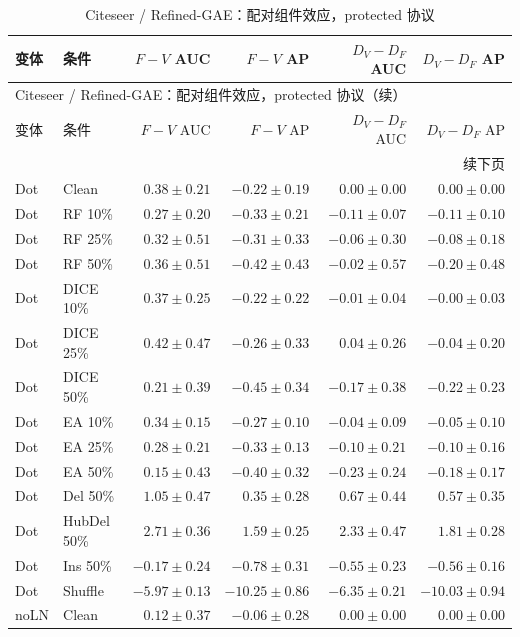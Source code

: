 {\footnotesize
\setlength{\tabcolsep}{3.2pt}
\renewcommand{\arraystretch}{1.10}
\begin{longtable}{llrrrr}
\caption{Citeseer / Refined-GAE：配对组件效应，protected 协议}\\
\toprule
变体 & 条件 & $F-V$ AUC & $F-V$ AP & $D_V-D_F$ AUC & $D_V-D_F$ AP \\
\midrule
\endfirsthead
\multicolumn{6}{l}{Citeseer / Refined-GAE：配对组件效应，protected 协议（续）}\\
\toprule
变体 & 条件 & $F-V$ AUC & $F-V$ AP & $D_V-D_F$ AUC & $D_V-D_F$ AP \\
\midrule
\endhead
\midrule\multicolumn{6}{r}{续下页}\\
\endfoot
\bottomrule
\endlastfoot
Dot & Clean & $0.38\pm0.21$ & $-0.22\pm0.19$ & $0.00\pm0.00$ & $0.00\pm0.00$ \\
Dot & RF 10\% & $0.27\pm0.20$ & $-0.33\pm0.21$ & $-0.11\pm0.07$ & $-0.11\pm0.10$ \\
Dot & RF 25\% & $0.32\pm0.51$ & $-0.31\pm0.33$ & $-0.06\pm0.30$ & $-0.08\pm0.18$ \\
Dot & RF 50\% & $0.36\pm0.51$ & $-0.42\pm0.43$ & $-0.02\pm0.57$ & $-0.20\pm0.48$ \\
Dot & DICE 10\% & $0.37\pm0.25$ & $-0.22\pm0.22$ & $-0.01\pm0.04$ & $-0.00\pm0.03$ \\
Dot & DICE 25\% & $0.42\pm0.47$ & $-0.26\pm0.33$ & $0.04\pm0.26$ & $-0.04\pm0.20$ \\
Dot & DICE 50\% & $0.21\pm0.39$ & $-0.45\pm0.34$ & $-0.17\pm0.38$ & $-0.22\pm0.23$ \\
Dot & EA 10\% & $0.34\pm0.15$ & $-0.27\pm0.10$ & $-0.04\pm0.09$ & $-0.05\pm0.10$ \\
Dot & EA 25\% & $0.28\pm0.21$ & $-0.33\pm0.13$ & $-0.10\pm0.21$ & $-0.10\pm0.16$ \\
Dot & EA 50\% & $0.15\pm0.43$ & $-0.40\pm0.32$ & $-0.23\pm0.24$ & $-0.18\pm0.17$ \\
Dot & Del 50\% & $1.05\pm0.47$ & $0.35\pm0.28$ & $0.67\pm0.44$ & $0.57\pm0.35$ \\
Dot & HubDel 50\% & $2.71\pm0.36$ & $1.59\pm0.25$ & $2.33\pm0.47$ & $1.81\pm0.28$ \\
Dot & Ins 50\% & $-0.17\pm0.24$ & $-0.78\pm0.31$ & $-0.55\pm0.23$ & $-0.56\pm0.16$ \\
Dot & Shuffle & $-5.97\pm0.13$ & $-10.25\pm0.86$ & $-6.35\pm0.21$ & $-10.03\pm0.94$ \\
noLN & Clean & $0.12\pm0.37$ & $-0.06\pm0.28$ & $0.00\pm0.00$ & $0.00\pm0.00$ \\

\end{longtable}}
